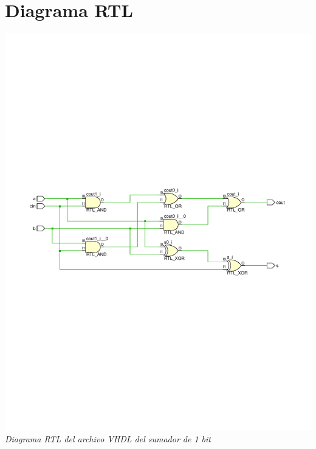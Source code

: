 \documentclass[12pt,executivepaper]{article}
\begin{document}
\section{Diagrama RTL}
\begin{center}
    \includegraphics[scale=0.7]{sources/schematic-Sumador.pdf}
    \textit{Diagrama RTL del archivo VHDL del sumador de 1 bit}

\end{center}
\end{document}
